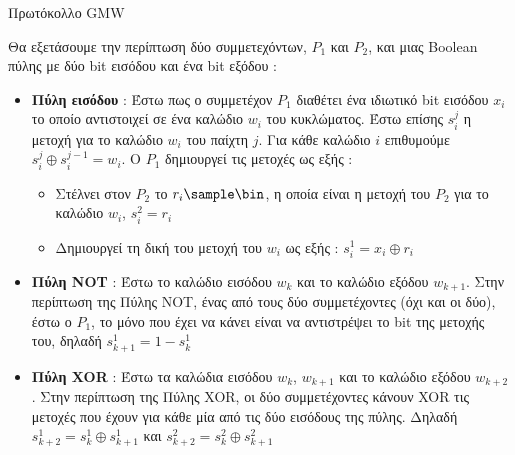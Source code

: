 \documentclass[10pt]{beamer}
\begin{document}
    \begin{frame}{Πρωτόκολλο GMW}
        \begin{block}{}
            Θα εξετάσουμε την περίπτωση δύο συμμετεχόντων, $P_1$ και $P_2$, και μιας Boolean πύλης με δύο bit εισόδου και ένα bit εξόδου :
            \begin{itemize}
                \item \textbf{Πύλη εισόδου} : Έστω πως ο συμμετέχον $P_1$ διαθέτει ένα ιδιωτικό bit εισόδου $x_i$ το οποίο αντιστοιχεί σε ένα καλώδιο $w_i$ του κυκλώματος. Έστω επίσης $s_i^j$ η μετοχή για το καλώδιο $w_i$ του παίχτη $j$. Για κάθε καλώδιο $i$ επιθυμούμε $s_i^j \oplus s_i^{j-1} = w_i$. Ο $P_1$ δημιουργεί τις μετοχές ως εξής :
                \begin{itemize}
                    \item Στέλνει στον $P_2$ το $r_i \sample \bin$, η οποία είναι η μετοχή του $P_2$ για το καλώδιο $w_i$, $s_i^2 = r_i$
                    \item Δημιουργεί τη δική του μετοχή του $w_i$ ως εξής : $s_i^1 = x_i \oplus r_i$
                \end{itemize}
                \item \textbf{Πύλη NOT} : Έστω το καλώδιο εισόδου $w_k$ και το καλώδιο εξόδου $w_{k+1}$. Στην περίπτωση της Πύλης NOT, ένας από τους δύο συμμετέχοντες (όχι και οι δύο), έστω ο $P_1$, το μόνο που έχει να κάνει είναι να αντιστρέψει το bit της μετοχής του, δηλαδή $s_{k+1}^1 = 1-s_k^1$
                \item \textbf{Πύλη XOR} : Έστω τα καλώδια εισόδου $w_k$, $w_{k+1}$ και το καλώδιο εξόδου $w_{k+2}$. Στην περίπτωση της Πύλης XOR, οι δύο συμμετέχοντες κάνουν XOR τις μετοχές που έχουν για κάθε μία από τις δύο εισόδους της πύλης. Δηλαδή $s_{k+2}^1 = s_{k}^1 \oplus s_{k+1}^1$ και $s_{k+2}^2 = s_k^2 \oplus s_{k+1}^2$
            \end{itemize}
        \end{block}
    \end{frame}
\end{document}
